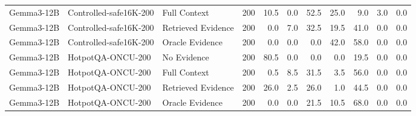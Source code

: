 \begin{tabular}{lllrrrrrrrr}
Gemma3-12B & Controlled-safe16K-200 & Full Context & 200 & 10.5 & 0.0 & 52.5 & 25.0 & 9.0 & 3.0 & 0.0 \\
Gemma3-12B & Controlled-safe16K-200 & Retrieved Evidence & 200 & 0.0 & 7.0 & 32.5 & 19.5 & 41.0 & 0.0 & 0.0 \\
Gemma3-12B & Controlled-safe16K-200 & Oracle Evidence & 200 & 0.0 & 0.0 & 0.0 & 42.0 & 58.0 & 0.0 & 0.0 \\
Gemma3-12B & HotpotQA-ONCU-200 & No Evidence & 200 & 80.5 & 0.0 & 0.0 & 0.0 & 19.5 & 0.0 & 0.0 \\
Gemma3-12B & HotpotQA-ONCU-200 & Full Context & 200 & 0.5 & 8.5 & 31.5 & 3.5 & 56.0 & 0.0 & 0.0 \\
Gemma3-12B & HotpotQA-ONCU-200 & Retrieved Evidence & 200 & 26.0 & 2.5 & 26.0 & 1.0 & 44.5 & 0.0 & 0.0 \\
Gemma3-12B & HotpotQA-ONCU-200 & Oracle Evidence & 200 & 0.0 & 0.0 & 21.5 & 10.5 & 68.0 & 0.0 & 0.0 \\
\bottomrule
\end{tabular}

